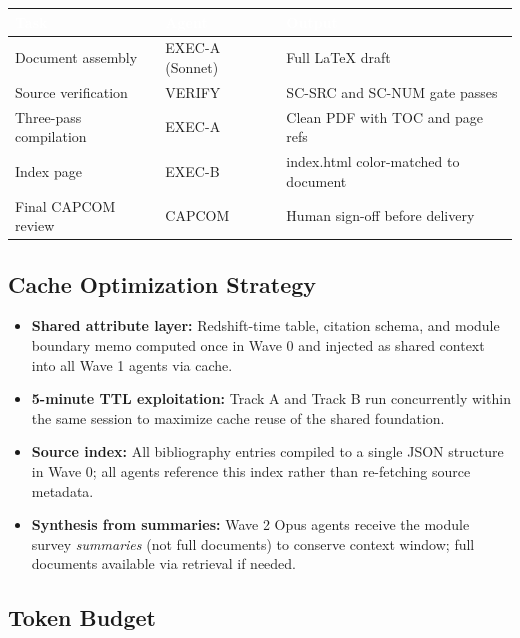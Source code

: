 \documentclass[11pt,letterpaper]{article}
\newcommand{\tableheader}[1]{\textbf{\sffamily\textcolor{white}{#1}}}
\begin{document}
\begin{center}
\begin{tabularx}{\textwidth}{L{3cm}L{2cm}X}
\toprule
{}
\tableheader{Task} & \tableheader{Agent} & \tableheader{Output} \\
\midrule
Document assembly & EXEC-A (Sonnet) & Full LaTeX draft \\
Source verification & VERIFY & SC-SRC and SC-NUM gate passes \\
Three-pass compilation & EXEC-A & Clean PDF with TOC and page refs \\
Index page & EXEC-B & index.html color-matched to document \\
Final CAPCOM review & CAPCOM & Human sign-off before delivery \\
\bottomrule
\end{tabularx}
\end{center}

\subsection{Cache Optimization Strategy}

\begin{itemize}
  \item \textbf{Shared attribute layer:} Redshift-time table, citation schema, and module boundary memo computed once in Wave 0 and injected as shared context into all Wave 1 agents via cache.
  \item \textbf{5-minute TTL exploitation:} Track A and Track B run concurrently within the same session to maximize cache reuse of the shared foundation.
  \item \textbf{Source index:} All bibliography entries compiled to a single JSON structure in Wave 0; all agents reference this index rather than re-fetching source metadata.
  \item \textbf{Synthesis from summaries:} Wave 2 Opus agents receive the module survey \emph{summaries} (not full documents) to conserve context window; full documents available via retrieval if needed.
\end{itemize}

\subsection{Token Budget}
\end{document}
